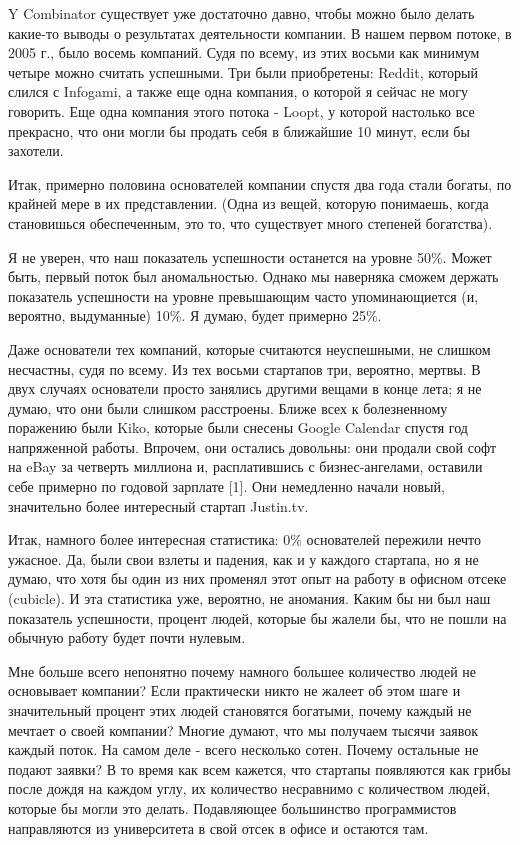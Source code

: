 \documentclass[ebook,12pt,oneside,openany]{memoir}
\begin{document}
\maketitle

Y Combinator существует уже достаточно давно, чтобы можно было делать
какие-то выводы о результатах деятельности компании. В нашем первом
потоке, в 2005 г., было восемь компаний. Судя по всему, из этих восьми
как минимум четыре можно считать успешными. Три были приобретены:
Reddit, который слился с Infogami, а также еще одна компания, о
которой я сейчас не могу говорить. Еще одна компания этого потока -
Loopt, у которой настолько все прекрасно, что они могли бы продать
себя в ближайшие 10 минут, если бы захотели.

Итак, примерно половина основателей компании спустя два года стали
богаты, по крайней мере в их представлении. (Одна из вещей, которую
понимаешь, когда становишься обеспеченным, это то, что существует
много степеней богатства).

Я не уверен, что наш показатель успешности останется на уровне 50\%.
Может быть, первый поток был аномальностью. Однако мы наверняка сможем
держать показатель успешности на уровне превышающим часто
упоминающиется (и, вероятно, выдуманные) 10\%. Я думаю, будет примерно
25\%.

Даже основатели тех компаний, которые считаются неуспешными, не
слишком несчастны, судя по всему. Из тех восьми стартапов три,
вероятно, мертвы. В двух случаях основатели просто занялись другими
вещами в конце лета; я не думаю, что они были слишком расстроены.
Ближе всех к болезненному поражению были Kiko, которые были снесены
Google Calendar спустя год напряженной работы. Впрочем, они остались
довольны: они продали свой софт на eBay за четверть миллиона и,
расплатившись с бизнес-ангелами, оставили себе примерно по годовой
зарплате [1]. Они немедленно начали новый, значительно более
интересный стартап Justin.tv.

Итак, намного более интересная статистика: 0\% основателей пережили
нечто ужасное. Да, были свои взлеты и падения, как и у каждого
стартапа, но я не думаю, что хотя бы один из них променял этот опыт на
работу в офисном отсеке (cubicle). И эта статистика уже, вероятно, не
аномания. Каким бы ни был наш показатель успешности, процент людей,
которые бы жалели бы, что не пошли на обычную работу будет почти
нулевым.

Мне больше всего непонятно почему намного большее количество людей не
основывает компании? Если практически никто не жалеет об этом шаге и
значительный процент этих людей становятся богатыми, почему каждый не
мечтает о своей компании? Многие думают, что мы получаем тысячи заявок
каждый поток. На самом деле - всего несколько сотен. Почему остальные
не подают заявки? В то время как всем кажется, что стартапы появляются
как грибы после дождя на каждом углу, их количество несравнимо с
количеством людей, которые бы могли это делать. Подавляющее
большинство программистов направляются из университета в свой отсек в
офисе и остаются там.
\end{document}
